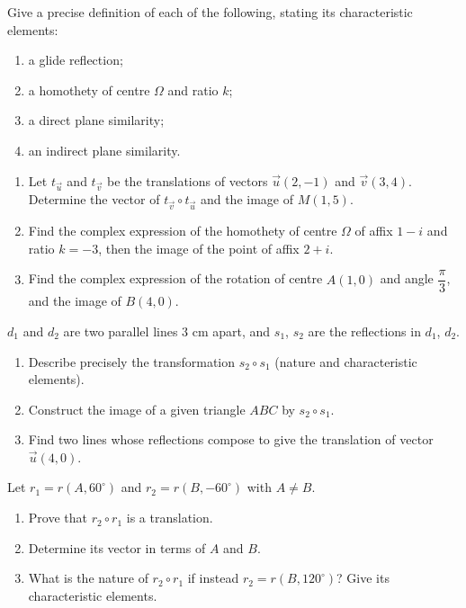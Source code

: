 \documentclass[11pt]{article}
\newcounter{popsec}
\newcounter{popsub}
\newcommand{\courssub}[1]{%
  \stepcounter{popsub}%
  \par\vspace{9pt}\noindent{\popxbold\fontsize{11.5}{13}\selectfont\color{popink}{\color{poporange}\thepopsec.\thepopsub}\hspace{6pt}#1}\par\nopagebreak\vspace{4pt}
}
\begin{document}
\begin{exercice}[Definitions]
Give a precise definition of each of the following, stating its characteristic elements:
\begin{enumerate}
\item a glide reflection;
\item a homothety of centre $\Omega$ and ratio $k$;
\item a direct plane similarity;
\item an indirect plane similarity.
\end{enumerate}
\end{exercice}

\begin{exercice}
\begin{enumerate}
\item Let $t_{\vec{u}}$ and $t_{\vec{v}}$ be the translations of vectors $\vec{u}(2,-1)$ and $\vec{v}(3,4)$. Determine the vector of $t_{\vec{v}} \circ t_{\vec{u}}$ and the image of $M(1,5)$.
\item Find the complex expression of the homothety of centre $\Omega$ of affix $1 - i$ and ratio $k = -3$, then the image of the point of affix $2 + i$.
\item Find the complex expression of the rotation of centre $A(1,0)$ and angle $\dfrac{\pi}{3}$, and the image of $B(4,0)$.
\end{enumerate}
\end{exercice}

\courssub{I practise}

\begin{exercice}
$d_1$ and $d_2$ are two parallel lines $3$ cm apart, and $s_1$, $s_2$ are the reflections in $d_1$, $d_2$.
\begin{enumerate}
\item Describe precisely the transformation $s_2 \circ s_1$ (nature and characteristic elements).
\item Construct the image of a given triangle $ABC$ by $s_2 \circ s_1$.
\item Find two lines whose reflections compose to give the translation of vector $\vec{u}(4,0)$.
\end{enumerate}
\end{exercice}

\begin{exercice}
Let $r_1 = r(A, 60^{\circ})$ and $r_2 = r(B, -60^{\circ})$ with $A \neq B$.
\begin{enumerate}
\item Prove that $r_2 \circ r_1$ is a translation.
\item Determine its vector in terms of $A$ and $B$.
\item What is the nature of $r_2 \circ r_1$ if instead $r_2 = r(B, 120^{\circ})$? Give its characteristic elements.
\end{enumerate}
\end{exercice}
\end{document}
